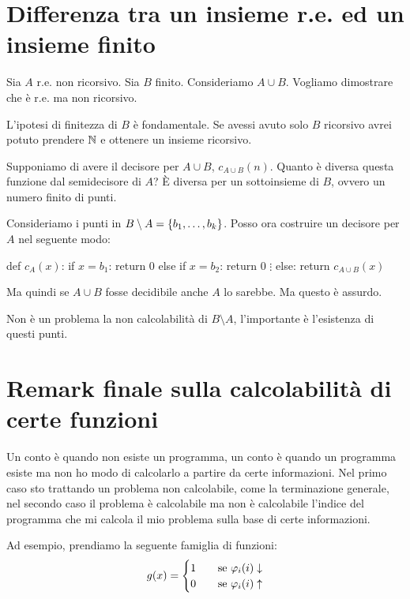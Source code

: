 \section{Differenza tra un insieme r.e. ed un insieme finito}

Sia $A$ r.e. non ricorsivo. Sia $B$ finito. Consideriamo $A \cup B$. Vogliamo dimostrare che è r.e.
ma non ricorsivo.

L'ipotesi di finitezza di $B$ è fondamentale. Se avessi avuto solo $B$ ricorsivo avrei potuto prendere
$\mathbb{N}$ e ottenere un insieme ricorsivo.

Supponiamo di avere il decisore per $A \cup B$, $c_{A \cup B}(n)$. Quanto è diversa questa funzione dal
semidecisore di $A$? È diversa per un sottoinsieme di $B$, ovvero un numero finito di punti.

Consideriamo i punti in $B \setminus A = \{b_{1},\dotsc,b_{k}\}$. Posso ora costruire un decisore
per $A$ nel seguente modo:
\begin{python}
def $c_{A}(x)$:
    if $x = b_{1}$:
        return 0
    else if $x = b_{2}$:
        return 0
    $\vdots$
    else:
        return $c_{A \cup B}(x)$
\end{python}

Ma quindi se $A \cup B$ fosse decidibile anche $A$ lo sarebbe. Ma questo è assurdo.

Non è un problema la non calcolabilità di $B \setminus A$, l'importante è l'esistenza di questi
punti.

\section{Remark finale sulla calcolabilità di certe funzioni}

Un conto è quando non esiste un programma, un conto è quando un programma esiste ma
non ho modo di calcolarlo a partire da certe informazioni. Nel primo caso sto trattando un problema
non calcolabile, come la terminazione generale, nel secondo caso il problema è calcolabile ma non è
calcolabile l'indice del programma che mi calcola il mio problema sulla base di certe informazioni.

Ad esempio, prendiamo la seguente famiglia di funzioni:
\begin{equation*}
    g(x) =
    \begin{cases}
        1 \quad &\text{se $\varphi_{i}(i) \downarrow$} \\
        0 \quad &\text{se $\varphi_{i}(i) \uparrow$} \\
    \end{cases}
\end{equation*}

